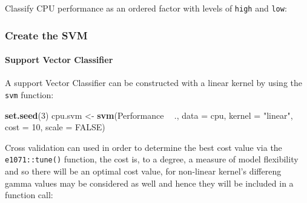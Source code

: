 \documentclass[12pt]{article}
\newenvironment{Shaded}{\begin{snugshade}}{\end{snugshade}}
\newcommand{\DataTypeTok}[1]{\textcolor[rgb]{0.13,0.29,0.53}{#1}}
\newcommand{\DecValTok}[1]{\textcolor[rgb]{0.00,0.00,0.81}{#1}}
\newcommand{\KeywordTok}[1]{\textcolor[rgb]{0.13,0.29,0.53}{\textbf{#1}}}
\newcommand{\NormalTok}[1]{#1}
\newcommand{\OperatorTok}[1]{\textcolor[rgb]{0.81,0.36,0.00}{\textbf{#1}}}
\newcommand{\OtherTok}[1]{\textcolor[rgb]{0.56,0.35,0.01}{#1}}
\newcommand{\StringTok}[1]{\textcolor[rgb]{0.31,0.60,0.02}{#1}}
\let\oldparagraph\paragraph
\renewcommand{\paragraph}[1]{\oldparagraph{#1}\mbox{}}
\begin{document}
Classify CPU performance as an ordered factor with levels of
\texttt{high} and \texttt{low}:

\begin{Shaded}
\end{Shaded}

\hypertarget{create-the-svm}{%
\subsubsection{Create the SVM}\label{create-the-svm}}

\hypertarget{support-vector-classifier}{%
\paragraph{Support Vector Classifier}\label{support-vector-classifier}}

A support Vector Classifier can be constructed with a linear kernel by
using the \texttt{svm} function:

\begin{Shaded}
\begin{Highlighting}[]
\KeywordTok{set.seed}\NormalTok{(}\DecValTok{3}\NormalTok{)}
\NormalTok{cpu.svm <-}\StringTok{ }\KeywordTok{svm}\NormalTok{(Performance }\OperatorTok{~}\StringTok{ }\NormalTok{., }\DataTypeTok{data =}\NormalTok{ cpu, }\DataTypeTok{kernel =} \StringTok{"linear"}\NormalTok{, }\DataTypeTok{cost =} \DecValTok{10}\NormalTok{, }\DataTypeTok{scale =} \OtherTok{FALSE}\NormalTok{)}
\end{Highlighting}
\end{Shaded}

Cross validation can used in order to determine the best cost value via
the \texttt{e1071::tune()} function, the cost is, to a degree, a measure
of model flexibility and so there will be an optimal cost value, for
non-linear kernel's differeng gamma values may be considered as well and
hence they will be included in a function call:
\end{document}
